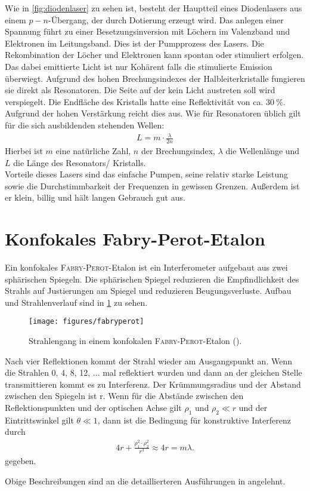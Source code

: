 \documentclass[../bericht.tex]{subfiles}
\begin{document}
      Wie in \cref{fig:diodenlaser} zu sehen ist, besteht der Hauptteil eines Diodenlasers aus einem $p-n$-Übergang, der durch Dotierung erzeugt wird. Das anlegen einer Spannung führt zu einer Besetzungsinversion mit Löchern im Valenzband und Elektronen im Leitungsband. Dies ist der Pumpprozess des Lasers. Die Rekombination der Löcher und Elektronen kann spontan oder stimuliert erfolgen. Das dabei emittierte Licht ist nur Kohärent falls die stimulierte Emission überwiegt.
      Aufgrund des hohen Brechungsindexes der Halbleiterkristalle fungieren sie direkt als Resonatoren. Die Seite auf der kein Licht austreten soll wird verspiegelt. Die Endfläche des Kristalls hatte eine Reflektivität von ca. $\SI{30}{\percent}$. Aufgrund der hohen Verstärkung reicht dies aus. Wie für Resonatoren üblich gilt für die sich ausbildenden stehenden Wellen:
      \begin{align*}
        L=m\cdot\frac{\lambda}{2n}
      \end{align*}
      Hierbei ist $m$ eine natürliche Zahl, $n$ der Brechungsindex, $\lambda$ die Wellenlänge und $L$ die Länge des Resonators/ Kristalls.\\
      Vorteile dieses Lasers sind das einfache Pumpen, seine relativ starke Leistung sowie die Durchstimmbarkeit der Frequenzen in gewissen Grenzen. Außerdem ist er klein, billig und hält langen Gebrauch gut aus.


    \section{Konfokales Fabry-Perot-Etalon}

      Ein konfokales \textsc{Fabry-Perot}-Etalon ist ein Interferometer aufgebaut aus zwei sphärischen Spiegeln. Die sphärischen Spiegel reduzieren die Empfindlichkeit des Strahls auf Justierungen am Spiegel und reduzieren Beugungsverluste. Aufbau und Strahlenverlauf sind in \cref{fig:fabry-perot} zu sehen.
      \begin{figure}
        \begin{center}
        \fbox
        {
          \texttt{[image: figures/fabryperot]}
        }
        \caption{Strahlengang in einem konfokalen \textsc{Fabry-Perot}-Etalon (\cite{fabry-perot}).}
        \label{fig:fabry-perot}
        \end{center}
      \end{figure}
      Nach vier Reflektionen kommt der Strahl wieder am Ausgangspunkt an. Wenn die Strahlen 0, 4, 8, 12, ... mal reflektiert wurden und dann an der gleichen Stelle transmittieren kommt es zu Interferenz. Der Krümmungsradius und der Abstand zwischen den Spiegeln ist r. Wenn für die Abstände zwischen den Reflektionspunkten und der optischen Achse gilt $\rho_1$ und $\rho_2 \ll r$ und der Eintrittswinkel gilt $\theta \ll 1$, dann ist die Bedingung für konstruktive Interferenz durch
      \begin{align*}
        4r+\frac{\rho_1^2\cdot\rho_2^2}{r^3}\approx4r=m\lambda.
      \end{align*}
      gegeben.

      Obige Beschreibungen sind an die detaillierteren Ausführungen in \cite{dem:laser} angelehnt.
\end{document}
